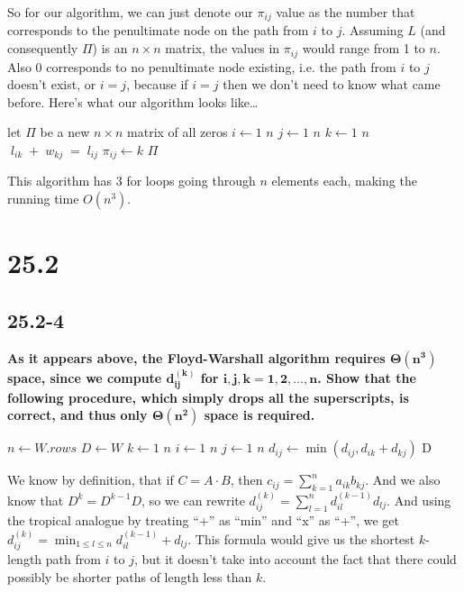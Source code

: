 \documentclass[11pt]{article}
\begin{document}
 So for our algorithm, we can just denote our \(\pi_{ij}\) value as the number that corresponds to 
 the penultimate node on the path from \(i\) to \(j\).  Assuming \(L\) (and consequently \(\Pi\)) 
 is an \(n \times n\) matrix, the values in \(\pi_{ij}\) would range from 1 to \(n\).  Also 0 
 corresponds to no penultimate node existing, i.e. the path from \(i\) to \(j\) doesn't exist, 
 or \(i = j\), because if \(i = j\) then we don't need to know what came before.  Here's what our 
 algorithm looks like\dots

 \singlespacing
 \begin{codebox}
   \li let \(\Pi\) be a new \(n \times n\) matrix of all zeros
   \li \For \(i \gets 1\) \To \(n\) \Do
   \li \For \(j \gets 1\) \To \(n\) \Do
   \li \For \(k \gets 1\) \To \(n\) \Do
   \li \If \(\;l_{ik} \;+\; w_{kj} \;=\; l_{ij}\) \Then 
   \li \(\pi_{ij} \gets k\) \End \End \End \End 
   \li \Return \(\Pi\)
 \end{codebox}

This algorithm has 3 for loops going through \(n\) elements each, making the running time \(O(n^3)\).
 \newpage

 \section*{25.2}
 \subsection*{25.2-4}
 \textbf{As it appears above, the Floyd-Warshall algorithm requires \(\mathbf{\Theta(n^3)}\) space, 
 since we compute \(\mathbf{d^{(k)}_{ij}}\) for \(\mathbf{i,j,k = 1,2, \dots, n}\). Show that the 
 following procedure, which simply drops all the superscripts, is correct, and thus only 
 \(\mathbf{\Theta(n^2)}\) space is required.} \\ 

 \singlespacing
 \begin{codebox}
   \li \(n \gets W.rows\)
   \li \(D \gets W\)
   \li \For \(k \gets 1\) \To \(n\) \Do
   \li \For \(i \gets 1\) \To \(n\) \Do
   \li \For \(j \gets 1\) \To \(n\) \Do
   \li \(d_{ij}\gets \min(d_{ij}, d_{ik} + d_{kj})\)
   \End \End \End 
   \li \Return D
 \end{codebox}
 We know by definition, that if \(C = A \cdot B\), then \(c_{ij} = 
 \displaystyle\sum_{k=1}^{n} a_{ik}b_{kj}\).  And we also know that \(D^k = D^{k-1}D\), so we can 
 rewrite \(d^{(k)}_{ij} = \displaystyle\sum_{l=1}^{n} d^{(k-1)}_{il}d_{lj}\).  And using the tropical 
 analogue by treating ``+'' as ``min'' and ``x'' as ``+'', we get \(d^{(k)}_{ij} = 
 \displaystyle\min_{1 \leq l \leq n}  d^{(k-1)}_{il} + d_{lj}\).  This formula would give us the 
 shortest \(k\)-length path from \(i\) to \(j\), but it doesn't take into account the fact that there 
 could possibly be shorter paths of length less than \(k\). \\ 
\end{document}

